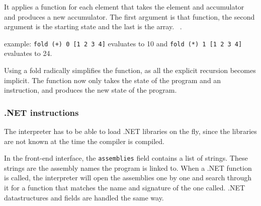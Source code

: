 It applies a function for each element that takes the element and accumulator and produces a new accumulator.
The first argument is that function, the second argument is the starting state and the last is the array.
~\cite{realworldhaskellch4}.

example: \texttt{fold (+) 0 [1 2 3 4]} evaluates to 10 and \texttt{fold (*) 1 [1 2 3 4]} evaluates to 24.

Using a fold radically simplifies the function, as all the explicit recursion becomes implicit.
The function now only takes the state of the program and an instruction, and produces the new state of the program.

\subsubsection{.NET instructions}
The interpreter has to be able to load .NET libraries on the fly, since the libraries are not known at the time the compiler is compiled.

In the front-end interface, the \verb|assemblies| field contains a list of strings.
These strings are the assembly names the program is linked to.
When a .NET function is called, the interpreter will open the assemblies one by one and search through it for a function that matches the name and signature of the one called.
.NET datastructures and fields are handled the same way.

